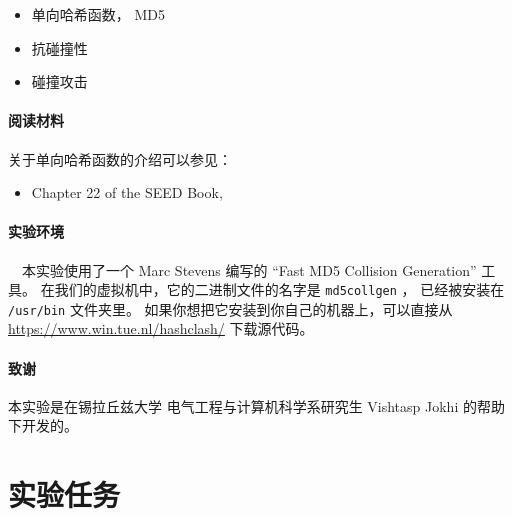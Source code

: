 \begin{itemize}[noitemsep]
\item 单向哈希函数， MD5
\item 抗碰撞性
\item 碰撞攻击
\end{itemize}


\paragraph{阅读材料}
关于单向哈希函数的介绍可以参见：

\begin{itemize}
\item Chapter 22 of the SEED Book, \seedbook
\end{itemize}



\paragraph{实验环境} \seedenvironmentB \ \
本实验使用了一个 Marc Stevens 编写的 ``Fast MD5 Collision Generation'' 工具。
在我们的虚拟机中，它的二进制文件的名字是 \texttt{md5collgen} ，
已经被安装在 \texttt{/usr/bin} 文件夹里。
如果你想把它安装到你自己的机器上，可以直接从 \url{https://www.win.tue.nl/hashclash/}
下载源代码。



\paragraph{致谢} 本实验是在锡拉丘兹大学
电气工程与计算机科学系研究生 Vishtasp Jokhi 的帮助下开发的。



\section{实验任务}


